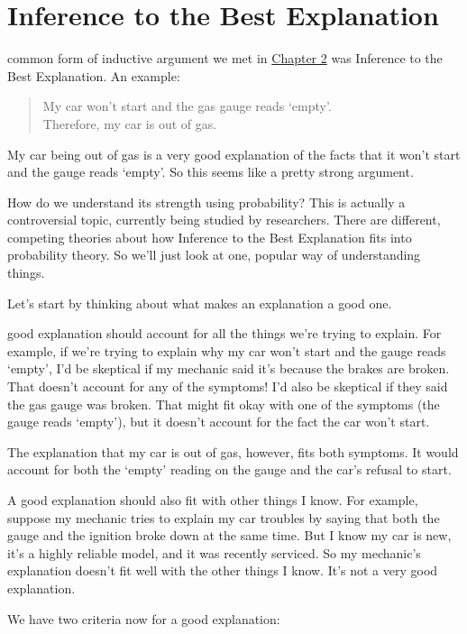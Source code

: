 \documentclass[justified]{tufte-book}
\newenvironment{argument}{\begin{quote}\normalsize}{\end{quote}}
\theoremstyle{definition}
\theoremstyle{definition}
\theoremstyle{definition}
\theoremstyle{remark}
\begin{document}
\hypertarget{bayesibe}{%
\section{Inference to the Best Explanation}\label{bayesibe}}

 common form of inductive argument we met in
\protect\hyperlink{logic}{Chapter 2} was Inference to the Best
Explanation. An example:

\begin{argument}
My car won't start and the gas gauge reads `empty'.\\
Therefore, my car is out of gas.
\end{argument}

My car being out of gas is a very good explanation of the facts that it
won't start and the gauge reads `empty'. So this seems like a pretty
strong argument.

How do we understand its strength using probability? This is actually a
controversial topic, currently being studied by researchers. There are
different, competing theories about how Inference to the Best
Explanation fits into probability theory. So we'll just look at one,
popular way of understanding things.

Let's start by thinking about what makes an explanation a good one.

 good explanation should account for all the things we're
trying to explain. For example, if we're trying to explain why my car
won't start and the gauge reads `empty', I'd be skeptical if my mechanic
said it's because the brakes are broken. That doesn't account for any of
the symptoms! I'd also be skeptical if they said the gas gauge was
broken. That might fit okay with one of the symptoms (the gauge reads
`empty'), but it doesn't account for the fact the car won't start.

The explanation that my car is out of gas, however, fits both symptoms.
It would account for both the `empty' reading on the gauge and the car's
refusal to start.

A good explanation should also fit with other things I know. For
example, suppose my mechanic tries to explain my car troubles by saying
that both the gauge and the ignition broke down at the same time. But I
know my car is new, it's a highly reliable model, and it was recently
serviced. So my mechanic's explanation doesn't fit well with the other
things I know. It's not a very good explanation.

We have two criteria now for a good explanation:
\end{document}
